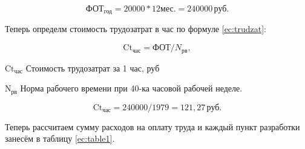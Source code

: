\begin{equation*}
    \text{ФОТ}_\text{год} = 20 000 * 12 \text{мес.} = 240 000 \, \text{руб.}
\end{equation*}

Теперь определм стоимость трудозатрат в час по формуле \ref{ec:trudzat}:

\begin{equation}
    \label{ec:trudzat}
    \text{Ct}_\text{час} = \text{ФОТ} / N_\text{рв},
\end{equation}

\begin{eqexpl}[5ex]
    \item{$\text{Ct}_\text{час}$} Стоимость трудозатрат за 1 час, руб
    \item{$\text{N}_\text{рв}$} Норма рабочего времени при 40-ка часовой рабочей
неделе.
\end{eqexpl}

\begin{equation*}
    \text{Ct}_\text{час} = 240 000 / 1979 = 121,27 \, \text{руб}.
\end{equation*}

Теперь рассчитаем сумму расходов на оплату труда и каждый пункт
разработки занесём в таблицу \ref{ec:table1}.

